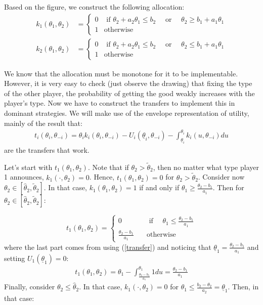 \documentclass[a4paper]{article}
\begin{document}
Based on the figure, we construct the following allocation:
\begin{align*}
	k_1(\theta_1,\theta_2) &=
	\begin{cases}
		0 & \text{ if } \theta_2+a_2\theta_1\leq b_2\quad \text{ or }\quad \theta_2\geq b_1+a_1\theta_1\\
		1 & \text{otherwise}
	\end{cases}
	\\
	k_2(\theta_1,\theta_2) &=
	\begin{cases}
		0 & \text{ if } \theta_2+a_2\theta_1\leq b_2\quad \text{ or }\quad \theta_2\leq b_1+a_1\theta_1\\
		1 & \text{otherwise}
	\end{cases}
\end{align*}

We know that the allocation must be monotone for it to be implementable. However, it is very easy to check (just observe the drawing) that fixing the type of the other player, the probability of getting the good weakly increases with the player's type. Now we have to construct the transfers to implement this in dominant strategies. We will make use of the envelope representation of utility, mainly of the result that:
\begin{align} \label{transfer}
	t_i(\theta_i,\theta_{-i}) = \theta_i k_i(\theta_i,\theta_{-i}) - U_i(\underline{\theta}_{i}, \theta_{-i}) - \int_{\underline{\theta}_{i}}^{\theta_i} k_{i} (u,\theta_{-i}) du
\end{align}
are the transfers that work.

Let's start with $t_1(\theta_1,\theta_2)$. Note that if $\theta_2>\tilde{\theta}_2$, then no matter what type player 1 announces, $k_1(\cdot,\theta_2)=0$. Hence, $t_1(\theta_1,\theta_2)=0$ for $\theta_2>\tilde{\theta}_2$. Consider now $\theta_2\in[\hat{\theta}_2,\tilde{\theta}_2]$. In that case, $k_1(\theta_1,\theta_2)=1$ if and only if $\theta_1\geq\frac{\theta_2-b_1}{a_1}$. Then for $\theta_2\in[\hat{\theta}_2,\tilde{\theta}_2]$:

\[t_1(\theta_1,\theta_2)=\left\{\begin{array}{cc} 0 & \quad\text{ if }\quad  \theta_1\leq\frac{\theta_2-b_1}{a_1}\\
	\frac{\theta_2-b_1}{a_1} & \quad\text{otherwise}\quad
	
\end{array}
\right.
\]
where the last part comes from using (\ref{transfer}) and noticing that $\underline{\theta}_1=\frac{\theta_2-b_1}{a_1}$ and setting $U_1(\underline{\theta}_1)=0$:
\begin{align*}
	t_1(\theta_1,\theta_2)=\theta_1-\int_{\frac{\theta_2-b_1}{a_1}}^{\theta_1}1 du=\frac{\theta_2-b_1}{a_1}
\end{align*}
Finally, consider $\theta_2\leq\hat{\theta}_2$. In that case, $k_1(\cdot,\theta_2)=0$ for $\theta_1\leq \frac{b_2-\theta_2}{a_2}=\underline{\theta}_1$. Then, in that case:
\end{document}
